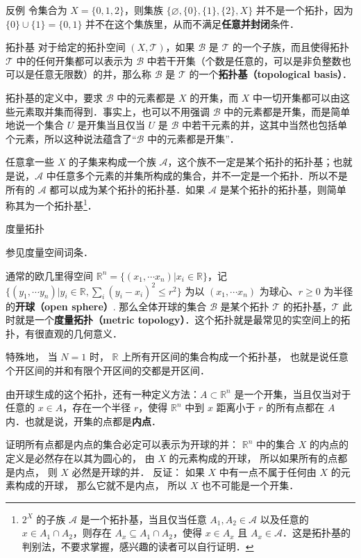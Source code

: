 \begin{example}{反例}
令集合为 $X=\{0, 1, 2\}$，则集族 $\{\varnothing, \{0\},\{1\},\{2\}, X\}$ 并不是一个拓扑，因为 $\{0\}\cup\{1\}=\{0,1\}$ 并不在这个集族里，从而不满足\textbf{任意并封闭}条件．
\end{example}

\begin{definition}{拓扑基}\label{Topol_def2}
对于给定的拓扑空间 $(X, \mathcal{T})$，如果 $\mathcal{B}$ 是 $\mathcal{T}$ 的一个子族，而且使得拓扑 $\mathcal{T}$ 中的任何开集都可以表示为 $\mathcal{B}$ 中若干开集（个数是任意的，可以是非负整数也可以是任意无限数）的并，那么称 $\mathcal{B}$ 是 $\mathcal{T}$ 的一个\textbf{拓扑基（topological basis）}．
\end{definition}

拓扑基的定义中，要求 $\mathcal{B}$ 中的元素都是 $X$ 的开集，而 $X$ 中一切开集都可以由这些元素取并集而得到．事实上，也可以不用强调
$\mathcal{B}$ 中的元素都是开集，而是简单地说一个集合 $U$ 是开集当且仅当 $U$ 是 $\mathcal{B}$ 中若干元素的并，这其中当然也包括单个元素，所以这种说法蕴含了“$\mathcal{B}$ 中的元素都是开集”．

任意拿一些 $X$ 的子集来构成一个族 $\mathcal{A}$，这个族不一定是某个拓扑的拓扑基；也就是说，$\mathcal{A}$ 中任意多个元素的并集所构成的集合，并不一定是一个拓扑．所以不是所有的 $\mathcal{A}$ 都可以成为某个拓扑的拓扑基．如果 $\mathcal{A}$ 是某个拓扑的拓扑基，则简单称其为一个拓扑基\footnote{$2^X$ 的子族 $\mathcal{A}$ 是一个拓扑基，当且仅当任意 $A_1, A_2\in\mathcal{A}$ 以及任意的 $x\in A_1\cap A_2$，则存在 $A_x\subseteq A_1\cap A_2$，使得 $x\in A_x$ 且 $A_x\in \mathcal{A}$．这是拓扑基的判别法，不要求掌握，感兴趣的读者可以自行证明．}．


\begin{example}{度量拓扑}

参见度量空间词条．

通常的欧几里得空间 $\mathbb{R}^n=\{(x_1, \cdots x_n)|x_i\in \mathbb{R}\}$，记 $\{(y_1, \cdots y_n)|y_i\in \mathbb{R}, \sum_i(y_i-x_i)^2\leq r^2\}$ 为以 $(x_1, \cdots x_n)$ 为球心、$r\geqslant 0$ 为半径的\textbf{开球（open sphere）}. 那么全体开球的集合 $\mathcal{B}$ 是某个拓扑 $\mathcal{T}$ 的拓扑基，$\mathcal{T}$ 此时就是一个\textbf{度量拓扑（metric topology）}．这个拓扑就是最常见的实空间上的拓扑，有很直观的几何意义．

特殊地， 当 $N = 1$ 时， $\mathbb R$ 上所有开区间的集合构成一个拓扑基， 也就是说任意个开区间的并和有限个开区间的交都是开区间．

由开球生成的这个拓扑，还有一种定义方法：$A\subset \mathbb{R}^n$ 是一个开集，当且仅当对于任意的 $x\in A$，存在一个半径 $r$，使得 $\mathbb R^n$ 中到 $x$ 距离小于 $r$ 的所有点都在 $A$ 内．也就是说，开集的点都是\textbf{内点}．

证明所有点都是内点的集合必定可以表示为开球的并： $\mathbb R^n$ 中的集合 $X$ 的内点的定义是必然存在以其为圆心的， 由 $X$ 的元素构成的开球， 所以如果所有的点都是内点， 则 $X$ 必然是开球的并． 反证： 如果 $X$ 中有一点不属于任何由 $X$ 的元素构成的开球， 那么它就不是内点， 所以 $X$ 也不可能是一个开集．
\end{example}

